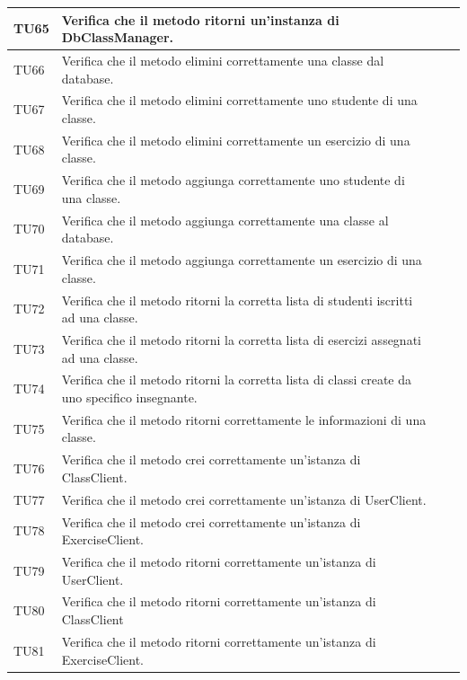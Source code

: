 \begin{longtable}{|>{\centering\arraybackslash}m{1.6cm}|>{\centering\arraybackslash}m{6.41cm}|>{\centering\arraybackslash}m{3.1cm}| c |}
		TU65 & Verifica che il metodo ritorni un'instanza di DbClassManager.  \\ \hline
		TU66 & Verifica che il metodo elimini correttamente una classe dal database.  \\ \hline
		\rowcolor{LightGray}
		TU67 & Verifica che il metodo elimini correttamente uno studente di una classe.  \\ \hline
		TU68 & Verifica che il metodo elimini correttamente un esercizio di una classe.  \\ \hline
		\rowcolor{LightGray}
		TU69 & Verifica che il metodo aggiunga correttamente uno studente di una classe.  \\ \hline
		TU70 & Verifica che il metodo aggiunga correttamente una classe al database. \\ \hline
		\rowcolor{LightGray}
		TU71 & Verifica che il metodo aggiunga correttamente un esercizio di una classe.  \\ \hline
		TU72 & Verifica che il metodo ritorni la corretta lista di studenti iscritti ad una classe.  \\ \hline
		\rowcolor{LightGray}
		TU73 & Verifica che il metodo ritorni la corretta lista di esercizi assegnati ad una classe.  \\ \hline
		TU74 & Verifica che il metodo ritorni la corretta lista di classi create da uno specifico insegnante.  \\ \hline
		\rowcolor{LightGray}
		TU75 & Verifica che il metodo ritorni correttamente le informazioni di una classe.  \\ \hline
		
		TU76 & Verifica che il metodo crei correttamente un'istanza di ClassClient.  \\ \hline
		\rowcolor{LightGray}
		TU77 & Verifica che il metodo crei correttamente un'istanza di UserClient.  \\ \hline
		TU78 & Verifica che il metodo crei correttamente un'istanza di ExerciseClient.  \\ \hline
		\rowcolor{LightGray}
		TU79 & Verifica che il metodo ritorni correttamente un'istanza di UserClient.  \\ \hline
		TU80 & Verifica che il metodo ritorni correttamente un'istanza di ClassClient  \\ \hline
		\rowcolor{LightGray}
		TU81 & Verifica che il metodo ritorni correttamente un'istanza di ExerciseClient.  \\ \hline
		

\end{longtable}
